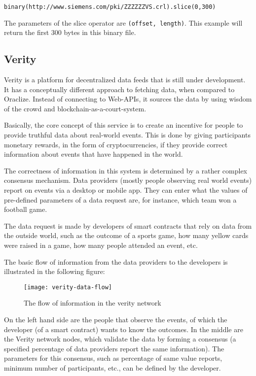 \texttt{binary(http://www.siemens.com/pki/ZZZZZZVS.crl).slice(0,300)}

The parameters of the slice operator are \texttt{(offset, length)}. This example will return the first 300 bytes in this binary file.
\subsection{Verity}
Verity is a platform for decentralized data feeds that is still under development. It has a conceptually different approach to fetching data, when compared to Oraclize. Instead of connecting to Web-APIs, it sources the data by using wisdom of the crowd and blockchain-as-a-court-system\cite{veritywhitepaper}.

Basically, the core concept of this service is to create an incentive for people to provide truthful data about real-world events. This is done by giving participants monetary rewards, in the form of cryptocurrencies, if they provide correct information about events that have happened in the world.

The correctness of information in this system is determined by a rather complex consensus mechanism. Data providers (mostly people observing real world events) report on events via a desktop or mobile app. They can enter what the values of pre-defined parameters of a data request are, for instance, which team won a football game. 

The data request is made by developers of smart contracts that rely on data from the outside world, such as the outcome of a sports game, how many yellow cards were raised in a game, how many people attended an event, etc. 

The basic flow of information from the data providers to the developers is illustrated in the following figure:
\begin{figure}[H]
\centering
\texttt{[image: verity-data-flow]}
\caption{The flow of information in the verity network\cite{veritywhitepaper}}
\end{figure}

On the left hand side are the people that observe the events, of which the developer (of a smart contract) wants to know the outcomes. In the middle are the Verity network nodes, which validate the data by forming a consensus (\eg a specified percentage of data providers report the same information). The parameters for this consensus, such as percentage of same value reports, minimum number of participants, etc., can be defined by the developer. 

